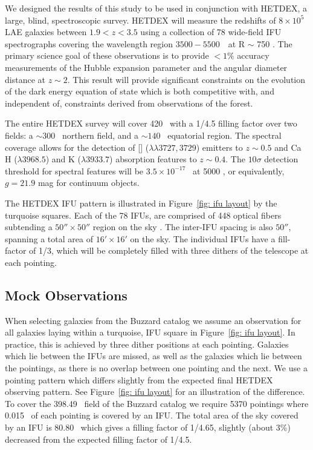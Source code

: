 \documentclass[fleqn,usenatbib]{mnras}
\begin{document}
We designed the results of this study to be used in conjunction with HETDEX, a large, blind, spectroscopic survey. HETDEX will measure the redshifts of $8 \times 10^5$ LAE galaxies between $1.9 < z < 3.5$ using a collection of 78 wide-field IFU spectrographs covering the wavelength region $3500 - 5500$~\AAA\ at R $\sim$ 750 \citep{Hill2008}. The primary science goal of these observations is to provide $<1\%$ accuracy measurements of the Hubble expansion parameter and the angular diameter distance at $z\sim2$. This result will provide significant constraints on the evolution of the dark energy equation of state which is both competitive with, and independent of, constraints derived from observations of the \lya forest.

The entire HETDEX survey will cover 420 \degsq\ with a 1/4.5 filling factor over two fields: a $\sim 300$ \degsq\ northern field, and a $\sim 140$ \degsq\ equatorial region. The spectral coverage allows for the detection of [] ($\lambda\lambda 3727,3729$) emitters to $z\sim 0.5$ and Ca H ($\lambda 3968.5$) and K ($\lambda 3933.7$) absorption features to $z\sim 0.4$. The $10 \sigma$ detection threshold for spectral features will be $3.5\times10^{-17}$ \ergscm\ at 5000 \AAA, or equivalently, $g = 21.9$ mag for continuum objects. 

The HETDEX IFU pattern is illustrated in Figure~\ref{fig: ifu layout} by the turquoise squares. Each of the 78 IFUs, are comprised of 448 optical fibers subtending a $50'' \times 50''$ region on the sky \citep{Kelz2014}. The inter-IFU spacing is also $50''$, spanning a total area of $16'\times 16'$ on the sky. The individual IFUs have a fill-factor of 1/3, which will be completely filled with three dithers of the telescope at each pointing.

\subsection{Mock Observations}\label{sec: observations}
When selecting galaxies from the Buzzard catalog we assume an observation for all galaxies laying within a turquoise, IFU square in Figure~\ref{fig: ifu layout}. In practice, this is achieved by three dither positions at each pointing. Galaxies which lie between the IFUs are missed, as well as the galaxies which lie between the pointings, as there is no overlap between one pointing and the next. We use a pointing pattern which differs slightly from the expected final HETDEX observing pattern. See Figure~\ref{fig: ifu layout} for an illustration of the difference. To cover the 398.49 \degsq\ field of the Buzzard catalog we require 5370 pointings where 0.015 \degsq\ of each pointing is covered by an IFU. The total area of the sky covered by an IFU is 80.80 \degsq\ which gives a filling factor of 1/4.65, slightly (about 3\%) decreased from the expected filling factor of 1/4.5.
\end{document}
